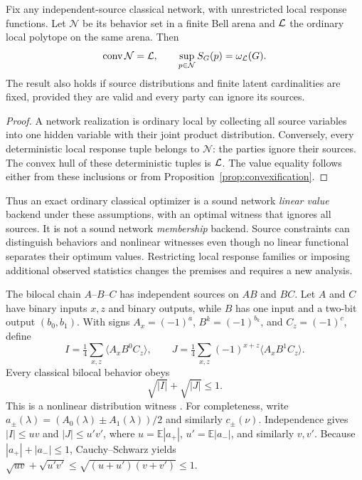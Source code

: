\begin{proposition}
\label{prop:networklinear}
Fix any independent-source classical network, with unrestricted local response
functions. Let $\mathcal N$ be its behavior set in a finite Bell arena and
$\mathcal L$ the ordinary local polytope on the same arena. Then
\[
 \operatorname{conv}\mathcal N=\mathcal L,\qquad
 \sup_{p\in\mathcal N}S_G(p)=\omega_{\mathcal L}(G).
\]
The result also holds if source distributions and finite latent cardinalities
are fixed, provided they are valid and every party can ignore its sources.
\end{proposition}
\begin{proof}
A network realization is ordinary local by collecting all source variables
into one hidden variable with their joint product distribution. Conversely,
every deterministic local response tuple belongs to $\mathcal N$: the
parties ignore their sources. The convex hull of these deterministic tuples
is $\mathcal L$. The value equality follows either from these inclusions or from
Proposition~\ref{prop:convexification}.
\end{proof}
Thus an exact ordinary classical optimizer is a sound network \emph{linear
value} backend under these assumptions, with an optimal witness that ignores
all sources. It is not a sound network \emph{membership} backend. Source
constraints can distinguish behaviors and nonlinear witnesses even though
no linear functional separates their optimum values. Restricting local
response families or imposing additional observed statistics changes the
premises and requires a new analysis.

The bilocal chain $A$--$B$--$C$ has independent sources on $AB$ and $BC$.
Let $A$ and $C$ have binary inputs $x,z$ and binary outputs, while $B$ has
one input and a two-bit output $(b_0,b_1)$. With signs
$A_x=(-1)^a$, $B^k=(-1)^{b_k}$, and $C_z=(-1)^c$, define
\[
 I=\tfrac14\sum_{x,z}\langle A_xB^0C_z\rangle,\qquad
 J=\tfrac14\sum_{x,z}(-1)^{x+z}\langle A_xB^1C_z\rangle.
\]
Every classical bilocal behavior obeys
\begin{equation}
 \sqrt{|I|}+\sqrt{|J|}\leq1.
 \label{eq:bilocal}
\end{equation}
This is a nonlinear distribution witness \cite{branciard2012}.
For completeness, write $a_\pm(\lambda)=(A_0(\lambda)\pm
A_1(\lambda))/2$ and similarly $c_\pm(\nu)$. Independence gives
$|I|\leq uv$ and $|J|\leq u'v'$, where
$u=\mathbb E|a_+|$, $u'=\mathbb E|a_-|$, and similarly $v,v'$.
Because $|a_+|+|a_-|\leq1$, Cauchy--Schwarz yields
$\sqrt{uv}+\sqrt{u'v'}\leq\sqrt{(u+u')(v+v')}\leq1$.

